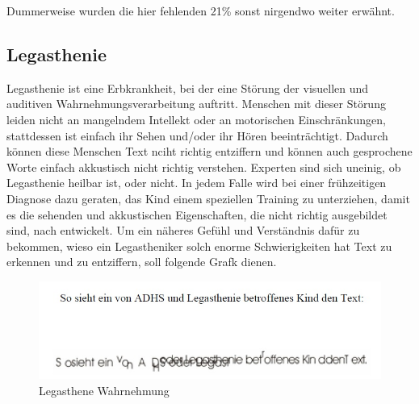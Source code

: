 Dummerweise wurden die hier fehlenden 21\% sonst nirgendwo weiter erwähnt.




\subsection{Legasthenie}


Legasthenie ist eine Erbkrankheit, bei der eine Störung der visuellen und auditiven Wahrnehmungsverarbeitung auftritt. Menschen mit dieser Störung leiden nicht an mangelndem Intellekt oder an motorischen Einschränkungen, stattdessen ist einfach ihr Sehen und/oder ihr Hören beeinträchtigt. Dadurch können diese Menschen Text nciht richtig entziffern und können auch gesprochene Worte einfach akkustisch nicht richtig verstehen. Experten sind sich uneinig, ob Legasthenie heilbar ist, oder nicht. In jedem Falle wird bei einer frühzeitigen Diagnose dazu geraten, das Kind einem speziellen Training zu unterziehen, damit es die sehenden und akkustischen Eigenschaften, die nicht richtig ausgebildet sind, nach entwickelt. Um ein näheres Gefühl und Verständnis dafür zu bekommen, wieso ein Legastheniker solch enorme Schwierigkeiten hat Text zu erkennen und zu entziffern, soll folgende Grafk dienen.\\


\begin{figure}[h]
	\centering
		\includegraphics[width=1.00\textwidth]{Daten/legastheneWahrnehmung.jpg}
	\caption{Legasthene Wahrnehmung}
	\label{fig:legastheneWahrnehmung}
\end{figure}





